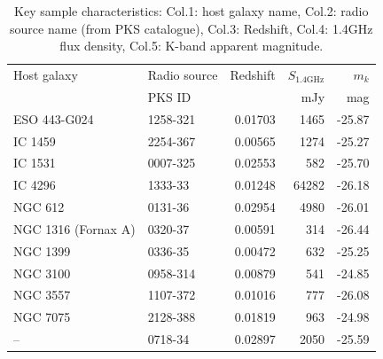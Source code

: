 	\begin{table}
		\centering
		\caption{Key sample characteristics: Col.1: host galaxy name, Col.2: radio source name (from PKS catalogue), Col.3: Redshift, Col.4: 1.4GHz flux density, Col.5: K-band apparent magnitude.}
		\label{tab:sample}
		\begin{tabular}{l l r r r}
			\hline
			\hline
			Host galaxy	& Radio source 	& Redshift	& $S_\text{1.4GHz}$	& $m_k$ \\
						& PKS ID 		& 			& mJy 				& mag \\
			\hline 
			ESO 443-G024 & 1258-321 	& 0.01703	& 1465 				& -25.87 \\ 
			IC 1459 	& 2254-367 		& 0.00565 	& 1274 				& -25.27 \\
			IC 1531 	& 0007-325 		& 0.02553 	& 582 				& -25.70 \\
			IC 4296		& 1333-33 		& 0.01248 	& 64282 			& -26.18 \\
			NGC 612 	& 0131-36 		& 0.02954 	& 4980 				& -26.01 \\
			NGC 1316 (Fornax A) & 0320-37 & 0.00591 & 314 				& -26.44 \\
			NGC 1399 	& 0336-35 		& 0.00472 	& 632 				& -25.25 \\
			NGC 3100 	& 0958-314 		& 0.00879 	& 541 				& -24.85 \\
			NGC 3557 	& 1107-372 		& 0.01016 	& 777 				& -26.08 \\
			NGC 7075 	& 2128-388 		& 0.01819 	& 963 				& -24.98 \\
			--			& 0718-34 		& 0.02897 	& 2050 				& -25.59 \\
			\hline
			\hline
		\end{tabular}
	\end{table}



